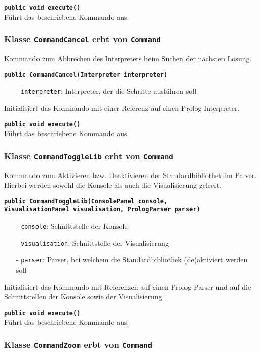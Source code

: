 \documentclass[parskip=full,11pt,twoside]{scrartcl}
\begin{document}
\textbf{\texttt{public void execute()}}\\
Führt das beschriebene Kommando aus.

\subsubsection{Klasse \texttt{CommandCancel} erbt von \texttt{Command}}

Kommando zum Abbrechen des Interpreters beim Suchen der nächsten Lösung.

\textbf{\texttt{public CommandCancel(Interpreter interpreter)}}
\begin{itemize}[noitemsep]
	\item[-] \texttt{interpreter}: Interpreter, der die Schritte ausführen soll
\end{itemize}
Initialisiert das Kommando mit einer Referenz auf einen Prolog-Interpreter.

\textbf{\texttt{public void execute()}}\\
Führt das beschriebene Kommando aus.

\subsubsection{Klasse \texttt{CommandToggleLib} erbt von \texttt{Command}}

Kommando zum Aktivieren bzw. Deaktivieren der Standardbibliothek im Parser. Hierbei werden sowohl die Konsole als auch die Visualisierung geleert.

\textbf{\texttt{public CommandToggleLib(ConsolePanel console,\\VisualisationPanel visualisation, PrologParser parser)}}
\begin{itemize}[noitemsep]
	\item[-] \texttt{console}: Schnittstelle der Konsole
	\item[-] \texttt{visualisation}: Schnittstelle der Visualisierung
	\item[-] \texttt{parser}: Parser, bei welchem die Standardbibliothek (de)aktiviert werden soll
\end{itemize}
Initialisiert das Kommando mit Referenzen auf einen Prolog-Parser und auf die Schnittstellen der Konsole sowie der Visualisierung.

\textbf{\texttt{public void execute()}}\\
Führt das beschriebene Kommando aus.

\subsubsection{Klasse \texttt{CommandZoom} erbt von \texttt{Command}}
\end{document}
